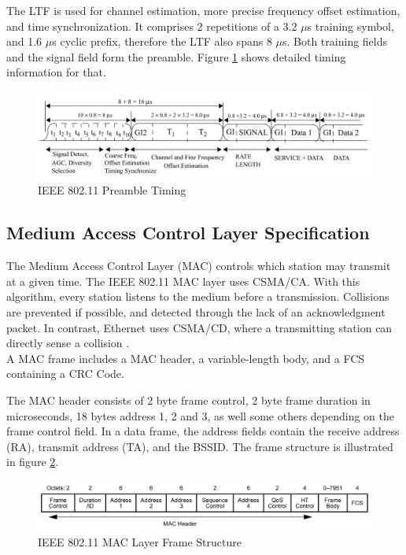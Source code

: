 The \gls{LTF} is used for channel estimation, more precise frequency offset estimation, and time synchronization. It comprises 2 repetitions of a 3.2 $\mu$s training symbol, and 1.6 $\mu$s cyclic prefix, therefore the \gls{LTF} also spans 8 $\mu$s. Both training fields and the signal field form the preamble. Figure \ref{fig:preamble} shows detailed timing information for that.

\begin{figure}[H]
	\centering
	\includegraphics[width=\textwidth]{gfx/images/preamble-format}
	\caption[\gls{IEEE} 802.11 Preamble Timing]{\gls{IEEE} 802.11 Preamble Timing \cite{ieee2012}}
	\label{fig:preamble}
\end{figure}


\subsection{Medium Access Control Layer Specification} \label{sec:mac-format}

The Medium Access Control Layer (MAC) controls which station may transmit at a given time. The \gls{IEEE} 802.11 \gls{MAC} layer uses \gls{CSMA/CA}. With this algorithm, every station listens to the medium before a transmission. Collisions are prevented if possible, and detected through the lack of an acknowledgment packet. In contrast, Ethernet uses \gls{CSMA/CD}, where a transmitting station can directly sense a collision \cite{ieee802-3}.\\

A \gls{MAC} frame includes a \gls{MAC} header, a variable-length body, and a \gls{FCS} containing a \gls{CRC} Code.

The \gls{MAC} header consists of 2 byte frame control, 2 byte frame duration in microseconds, 18 bytes address 1, 2 and 3, as well some others depending on the frame control field. In a data frame, the address fields contain the receive address (RA), transmit address (TA), and the \gls{BSSID}. The frame structure is illustrated in figure \ref{fig:mac-format}.

\begin{figure}[H]
	\centering
	\includegraphics[width=\textwidth]{gfx/images/mac-format}
	\caption[\gls{IEEE} 802.11 \gls{MAC} Layer Frame Structure]{\gls{IEEE} 802.11 \gls{MAC} Layer Frame Structure \cite{ieee2012}}
	\label{fig:mac-format}
\end{figure}


